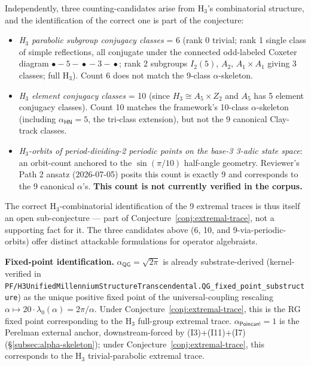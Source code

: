 \documentclass[11pt,a4paper]{amsart}
\theoremstyle{plain}
\theoremstyle{definition}
\begin{document}
Independently, three counting-candidates arise from H$_3$'s combinatorial structure, and the identification of the correct one is part of the conjecture:

\begin{itemize}[itemsep=1pt,leftmargin=2em]
\item \emph{H$_3$ parabolic subgroup conjugacy classes} = 6 (rank 0 trivial; rank 1 single class of simple reflections, all conjugate under the connected odd-labeled Coxeter diagram $\bullet\!-\!5\!-\!\bullet\!-\!3\!-\!\bullet$; rank 2 subgroups $I_2(5)$, $A_2$, $A_1 \times A_1$ giving 3 classes; full H$_3$). Count 6 does not match the 9-class $\alpha$-skeleton.
\item \emph{H$_3$ element conjugacy classes} = 10 (since $H_3 \cong A_5 \times Z_2$ and $A_5$ has 5 element conjugacy classes). Count 10 matches the framework's 10-class $\alpha$-skeleton (including $\alpha_{\textsf{HN}} = 5$, the tri-class extension), but not the 9 canonical Clay-track classes.
\item \emph{H$_3$-orbits of period-dividing-2 periodic points on the base-3 3-adic state space}: an orbit-count anchored to the $\sin(\pi/10)$ half-angle geometry. Reviewer's Path 2 ansatz (2026-07-05) posits this count is exactly 9 and corresponds to the 9 canonical $\alpha$'s. \textbf{This count is not currently verified in the corpus.}
\end{itemize}

The correct H$_3$-combinatorial identification of the 9 extremal traces is thus itself an open sub-conjecture --- part of Conjecture~\ref{conj:extremal-trace}, not a supporting fact for it. The three candidates above (6, 10, and 9-via-periodic-orbits) offer distinct attackable formulations for operator algebraists.

\textbf{Fixed-point identification.} $\alpha_{\textsf{QG}} = \sqrt{2\pi}$ is already substrate-derived (kernel-verified in \texttt{PF/H3UnifiedMillenniumStructureTranscendental.QG\_fixed\_point\_substructure}) as the unique positive fixed point of the universal-coupling rescaling $\alpha \mapsto 20 \cdot \lambda_0(\alpha) = 2\pi/\alpha$. Under Conjecture~\ref{conj:extremal-trace}, this is the RG fixed point corresponding to the H$_3$ full-group extremal trace. $\alpha_{\textsf{Poincar\'e}} = 1$ is the Perelman external anchor, downstream-forced by (I3)+(I11)+(I7) (\S\ref{subsec:alpha-skeleton}); under Conjecture~\ref{conj:extremal-trace}, this corresponds to the H$_3$ trivial-parabolic extremal trace.
\end{document}
